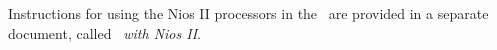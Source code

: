 Instructions for using the Nios II processors in the \systemName~are provided in 
a separate document, called {\it \systemName~with Nios II}.
